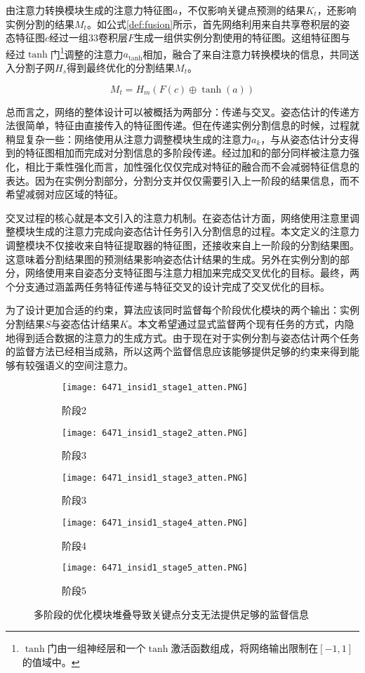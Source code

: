 由注意力转换模块生成的注意力特征图$a$，不仅影响关键点预测的结果$K_t$，还影响实例分割的结果$M_t$。如公式\eqref{def:fusion}所示，首先网络利用来自共享卷积层的姿态特征图$c$经过一组3\times3卷积层$F$生成一组供实例分割使用的特征图。这组特征图与经过$\tanh$门\footnote{$\tanh$门由一组神经层和一个$\tanh$激活函数组成，将网络输出限制在$[-1, 1]$的值域中。}调整的注意力$a_{\tanh}$相加，融合了来自注意力转换模块的信息，共同送入分割子网$H_s$得到最终优化的分割结果$M_t$。

\begin{equation}
\label{def:fusion}
M_t = H_m(F(c) \oplus \tanh(a))
\end{equation}

总而言之，网络的整体设计可以被概括为两部分：传递与交叉。姿态估计的传递方法很简单，特征由直接传入的特征图传递。但在传递实例分割信息的时候，过程就稍显复杂一些：网络使用从注意力调整模块生成的注意力$a_k$，与从姿态估计分支得到的特征图相加而完成对分割信息的多阶段传递。经过加和的部分同样被注意力强化，相比于乘性强化而言，加性强化仅仅完成对特征的融合而不会减弱特征信息的表达。因为在实例分割部分，分割分支并仅仅需要引入上一阶段的结果信息，而不希望减弱对应区域的特征。

交叉过程的核心就是本文引入的注意力机制。在姿态估计方面，网络使用注意里调整模块生成的注意力完成向姿态估计任务引入分割信息的过程。本文定义的注意力调整模块不仅接收来自特征提取器的特征图，还接收来自上一阶段的分割结果图。这意味着分割结果图的预测结果影响姿态估计结果的生成。另外在实例分割的部分，网络使用来自姿态分支特征图与注意力相加来完成交叉优化的目标。最终，两个分支通过涵盖两任务特征传递与特征交叉的设计完成了交叉优化的目标。

为了设计更加合适的约束，算法应该同时监督每个阶段优化模块的两个输出：实例分割结果$S$与姿态估计结果$K$。本文希望通过显式监督两个现有任务的方式，内隐地得到适合数据的注意力的生成方式。由于现在对于实例分割与姿态估计两个任务的监督方法已经相当成熟，所以这两个监督信息应该能够提供足够的约束来得到能够有较强语义的空间注意力。

\begin{figure}[ht]
	\centering
	\begin{subfigure}[b]{0.18\linewidth}
		\texttt{[image: 6471\_insid1\_stage1\_atten.PNG]}
		\caption{阶段2}
	\end{subfigure}
	\begin{subfigure}[b]{0.18\linewidth}
		\texttt{[image: 6471\_insid1\_stage2\_atten.PNG]}
		\caption{阶段3}
	\end{subfigure}
	\begin{subfigure}[b]{0.18\linewidth}
		\texttt{[image: 6471\_insid1\_stage3\_atten.PNG]}
		\caption{阶段3}
	\end{subfigure}
	\begin{subfigure}[b]{0.18\linewidth}
		\texttt{[image: 6471\_insid1\_stage4\_atten.PNG]}
		\caption{阶段4}
	\end{subfigure}
	\begin{subfigure}[b]{0.18\linewidth}
		\texttt{[image: 6471\_insid1\_stage5\_atten.PNG]}
		\caption{阶段5}
	\end{subfigure}
	\caption{多阶段的优化模块堆叠导致关键点分支无法提供足够的监督信息}
	\label{fig:multistageattention}
\end{figure}

